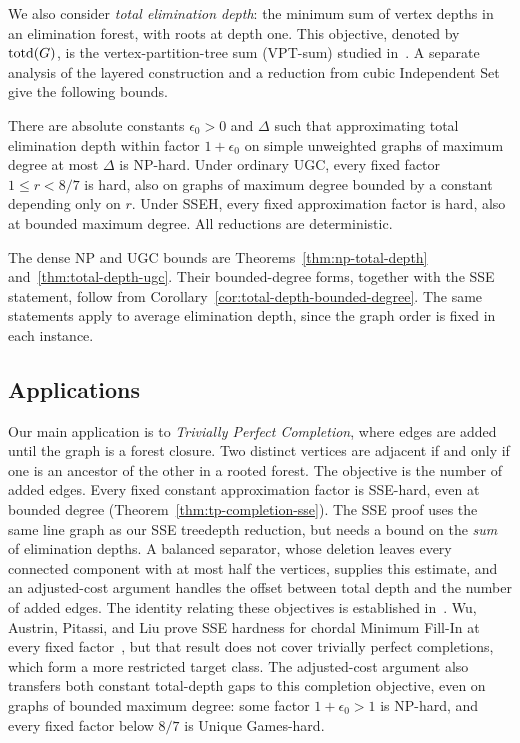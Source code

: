 We also consider \emph{total elimination depth}: the minimum sum
of vertex depths in an elimination forest, with roots at depth one.
This objective, denoted by $\operatorname{totd}(G)$, is the vertex-partition-tree
sum (VPT-sum) studied in~\cite{HogemoEtAl2021}.
A separate analysis of the layered
construction and a reduction from cubic Independent Set give the
following bounds.

\begin{theorem}\label{thm:total-depth-main}
There are absolute constants $\epsilon_0>0$ and $\Delta$ such that
approximating total elimination depth within factor $1+\epsilon_0$
on simple unweighted graphs of maximum degree at most $\Delta$ is
\textup{NP}-hard. Under ordinary \textup{UGC}, every fixed factor $1\leq r<8/7$ is
hard, also on graphs of maximum degree bounded by a constant
depending only on $r$. Under \textup{SSEH}, every fixed approximation
factor is hard, also at bounded maximum degree. All reductions
are deterministic.
\end{theorem}

The dense \textup{NP} and \textup{UGC} bounds are
Theorems~\ref{thm:np-total-depth} and~\ref{thm:total-depth-ugc}.
Their bounded-degree forms, together with the \textup{SSE} statement, follow
from Corollary~\ref{cor:total-depth-bounded-degree}.
The same statements apply to average elimination depth, since
the graph order is fixed in each instance.

\subsection{Applications}

Our main application is to \emph{Trivially Perfect Completion},
where edges are added until the graph is a forest closure. Two
distinct vertices are adjacent if and only if one is an ancestor of
the other in a rooted forest. The objective is the number of added
edges. Every fixed constant approximation factor is \textup{SSE}-hard, even at bounded degree
(Theorem~\ref{thm:tp-completion-sse}). The \textup{SSE} proof uses the same
line graph as our \textup{SSE} treedepth reduction, but needs a bound on the \emph{sum} of
elimination depths. A balanced separator, whose deletion leaves every
connected component with at most half the vertices, supplies this estimate,
and an adjusted-cost argument handles the offset between total depth
and the number of added edges. The identity relating these objectives
is established in~\cite{HogemoEtAl2021}. Wu, Austrin, Pitassi, and
Liu prove \textup{SSE} hardness for chordal Minimum Fill-In at every fixed
factor~\cite{APW}, but that result
does not cover trivially perfect completions, which form a more
restricted target class.
The adjusted-cost argument also transfers both constant total-depth
gaps to this completion objective, even on graphs of bounded maximum
degree: some factor $1+\epsilon_0>1$ is \textup{NP}-hard, and every fixed
factor below $8/7$ is Unique Games-hard.

